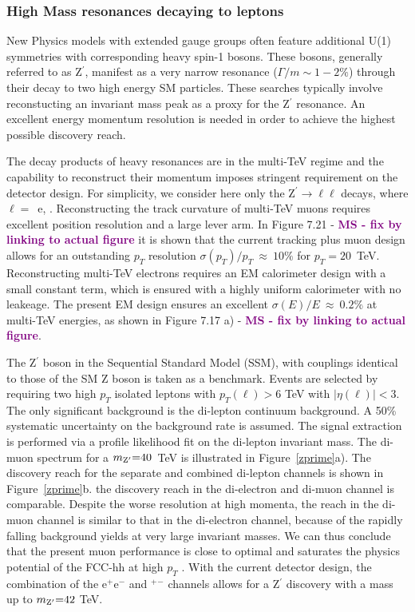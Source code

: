 \documentclass[11pt,twoside,a4paper]{cernrep}
\newcommand{\MS}[1]{\textbf{\textcolor{purple}{MS - #1}}}
\begin{document}
\subsubsection{High Mass resonances decaying to leptons}

New Physics models with extended gauge groups often feature additional U(1) symmetries with corresponding heavy spin-1 bosons. These bosons, generally referred to as Z$^{\prime}$, manifest as a very narrow resonance \mbox{($\Gamma/m \sim 1-2\%$)} through their decay to two high energy SM particles. These searches typically involve reconstucting an invariant mass peak as a proxy for the Z$^{\prime}$ resonance. An excellent energy momentum resolution is needed in order to achieve the highest possible discovery reach.

The decay products of heavy resonances are in the multi-TeV regime and the capability to reconstruct their momentum imposes stringent requirement on the detector design. For simplicity, we consider here only the Z$^{\prime}\rightarrow \ell\ell$ decays, where $\ell=$~e, \textmu.
Reconstructing the track curvature of multi-TeV muons requires excellent position resolution and a large lever arm. In Figure 7.21  - \MS{fix by linking to actual figure} it is shown that the current tracking plus muon design allows for an outstanding $p_T$ resolution $\sigma(p_T)/p_T~\approx~10\%$ for $p_T=20$~TeV. Reconstructing multi-TeV electrons requires an EM calorimeter design with a small constant term, which is ensured with a highly uniform calorimeter with no leakeage. The present EM design ensures an excellent $\sigma(E)/E~\approx~0.2\%$ at multi-TeV energies, as shown in Figure 7.17 a) - \MS{fix by linking to actual figure}.

The Z$^{\prime}$ boson in the Sequential Standard Model (SSM), with couplings identical to those of the SM Z boson is taken as a benchmark. Events are selected by requiring two high $p_{T}$ isolated leptons with $p_T(\ell)>6$ TeV with $|\eta(\ell)|<3$. The only significant background is the di-lepton continuum background. A 50\% systematic uncertainty on the background rate is assumed. The signal extraction is performed via a profile likelihood fit on the di-lepton invariant mass. The di-muon spectrum for a $m_{\rm Z^{\prime}} {=} 40$~TeV is illustrated in Figure~\ref{zprime}a). The discovery reach for the separate and combined di-lepton channels is shown in Figure~\ref{zprime}b.
the discovery reach in the di-electron and di-muon channel is comparable. Despite the worse resolution at high momenta, the reach in the di-muon channel is similar to that in the di-electron channel, because of the rapidly falling background yields at very large invariant masses. We can thus conclude that the present muon performance is close to optimal and saturates the physics potential of the FCC-hh at high $p_T$ . With the current detector design, the combination of the e$^+$e$^-$ and \textmu$^+$\textmu$^-$ channels allows for a Z$^{\prime}$ discovery with a mass up to $m_{\rm Z^{\prime}} {=} 42$ TeV.
\end{document}
